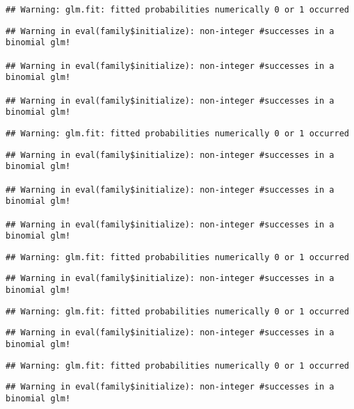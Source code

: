 \documentclass[
]{article}
\begin{document}
\begin{verbatim}
## Warning: glm.fit: fitted probabilities numerically 0 or 1 occurred
\end{verbatim}

\begin{verbatim}
## Warning in eval(family$initialize): non-integer #successes in a binomial glm!

## Warning in eval(family$initialize): non-integer #successes in a binomial glm!

## Warning in eval(family$initialize): non-integer #successes in a binomial glm!
\end{verbatim}

\begin{verbatim}
## Warning: glm.fit: fitted probabilities numerically 0 or 1 occurred
\end{verbatim}

\begin{verbatim}
## Warning in eval(family$initialize): non-integer #successes in a binomial glm!

## Warning in eval(family$initialize): non-integer #successes in a binomial glm!

## Warning in eval(family$initialize): non-integer #successes in a binomial glm!
\end{verbatim}

\begin{verbatim}
## Warning: glm.fit: fitted probabilities numerically 0 or 1 occurred
\end{verbatim}

\begin{verbatim}
## Warning in eval(family$initialize): non-integer #successes in a binomial glm!
\end{verbatim}

\begin{verbatim}
## Warning: glm.fit: fitted probabilities numerically 0 or 1 occurred
\end{verbatim}

\begin{verbatim}
## Warning in eval(family$initialize): non-integer #successes in a binomial glm!
\end{verbatim}

\begin{verbatim}
## Warning: glm.fit: fitted probabilities numerically 0 or 1 occurred
\end{verbatim}

\begin{verbatim}
## Warning in eval(family$initialize): non-integer #successes in a binomial glm!
\end{verbatim}
\end{document}
